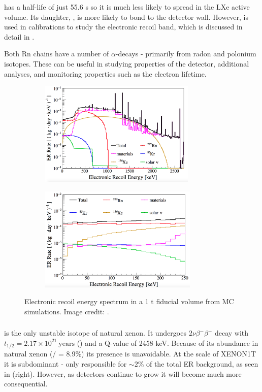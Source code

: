  has a half-life of just 55.6 s so it is much less likely to spread in the LXe active volume.  Its daughter, ,
is more likely to bond to the detector wall.  However,  is used in calibrations to study the electronic recoil band, which is
discussed in detail in .

Both Rn chains have a number of $\alpha$-decays - primarily from radon and polonium isotopes.  These can be useful in studying properties
of the detector, additional analyses, and monitoring properties such as the electron lifetime.

\begin{figure}
    \centering
    \begin{subfigure}[t]{0.5\textwidth}
        \centering
        \includegraphics[height=5cm]{ERRateMCFull}
    \end{subfigure}%
    \begin{subfigure}[t]{0.5\textwidth}
        \centering
        \includegraphics[height=5cm]{ERRateMCZoomed}
    \end{subfigure}
    \caption{Electronic recoil energy spectrum in a 1 t fiducial volume from MC simulations.  Image credit: .}
	\label{fig:backgrounds_er_spectrum}
\end{figure}



\subsubsection{}
\label{subsubsec:backgrounds_electronic_xe}
 is the only unstable isotope of natural xenon.  It undergoes $2 \nu \beta^- \beta^-$ decay with
$t_{1/2} = 2.17 \times 10^{21}\ \mathrm{years}$ () and a Q-value of 2458 keV.  Because of its abundance in natural
xenon (/ = 8.9\%) its presence is unavoidable.  At the scale of XENON1T it is subdominant - only responsible for
${\sim}2 \%$ of the total ER background, as seen in  (right).  However, as detectors continue to grow
it will become much more consequential.



